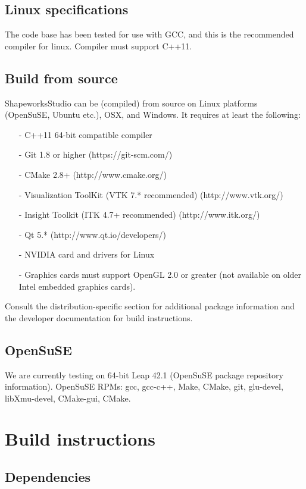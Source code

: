 \documentclass[letterpaper,12pt]{article}   %
\begin{document}
\subsection{Linux specifications}
The code base has been tested for use with GCC, and this is the recommended compiler for linux. Compiler must support C++11.

\subsection{Build from source}
ShapeworksStudio can be (compiled) from source on Linux platforms (OpenSuSE, Ubuntu etc.), OSX, and Windows. It requires at least the following:
\begin{itemize}
\item[-] C++11 64-bit compatible compiler
\item[-] Git 1.8 or higher (https://git-scm.com/)
\item[-] CMake 2.8+ (http://www.cmake.org/)
\item[-] Visualization ToolKit (VTK 7.* recommended) (http://www.vtk.org/)
\item[-] Insight Toolkit (ITK 4.7+ recommended) (http://www.itk.org/)
\item[-] Qt 5.* (http://www.qt.io/developers/)
\item[-] NVIDIA card and drivers for Linux
\item[-] Graphics cards must support OpenGL 2.0 or greater (not available on older Intel embedded graphics cards).
\end{itemize}

\noindent Consult the distribution-specific section for additional package information and the developer documentation for build instructions.

\subsection{OpenSuSE}

We are currently testing on 64-bit Leap 42.1 (OpenSuSE package repository information). OpenSuSE RPMs: gcc, gcc-c++, Make, CMake, git, glu-devel, libXmu-devel, CMake-gui, CMake.

\section{ Build instructions}

\subsection{Dependencies}
\end{document}
